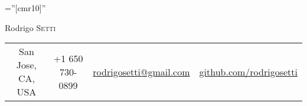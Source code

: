 \documentclass[a4paper,10pt]{article}
\begin{document}

\pagestyle{empty} %

\font\fb=''[cmr10]'' %

\par{\centering
		{\Huge Rodrigo \textsc{Setti}
	}\bigskip\par}

\begin{center}
\begin{tabular}{cccc}
		San Jose, CA, USA
    & +1 650 730-0899
    & \href{mailto:rodrigosetti@gmail.com}{rodrigosetti@gmail.com}
    & \href{https://github.com/rodrigosetti}{github.com/rodrigosetti}
\end{tabular}
\end{center}

\end{document}
